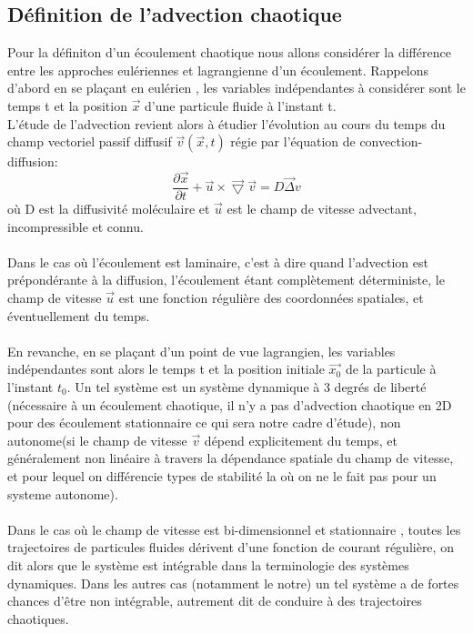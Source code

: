 \documentclass[a4paper,12pt,titlepage]{report}
\begin{document}
\begin{onehalfspace}
\subsection{Définition de l'advection chaotique}
Pour la définiton d'un écoulement chaotique nous allons considérer la différence entre les approches eulériennes et lagrangienne d'un écoulement. 
 Rappelons  d'abord en se plaçant en eulérien , les variables indépendantes à considérer sont le temps t et la position $\vec{x}$ d'une particule fluide à l'instant t. \\
 L'étude de l'advection revient alors à étudier l'évolution au cours du temps du champ vectoriel passif diffusif $\vec{v}(\vec{x},t)$ régie par l'équation de convection-diffusion: 
 \[
 \frac{\partial \vec{x}}{\partial t} + \vec{u} \times \vec{\bigtriangledown}\vec{v}= D \vec{\Delta} v
\]
où D est la diffusivité moléculaire et $\vec{u}$ est le champ de vitesse advectant, incompressible et connu. \\
\\
Dans le cas où l'écoulement est laminaire, c'est à dire quand l'advection est prépondérante à la diffusion, l'écoulement étant complètement déterministe, le champ de vitesse $\vec{u}$ est une fonction régulière des coordonnées spatiales, et éventuellement du temps. 
\\ 
\\
En revanche, en se plaçant d'un point de vue lagrangien, les variables indépendantes sont alors le temps t et la position initiale $\vec{x_0}$ de la particule à l'instant $t_0$. Un tel système est un système dynamique à 3 degrés de liberté (nécessaire à un écoulement chaotique, il n'y a pas d'advection chaotique en 2D pour des écoulement stationnaire ce qui sera notre cadre d'étude), non autonome(si le champ de vitesse $\vec{v}$ dépend explicitement du temps, et généralement non linéaire à travers la dépendance spatiale du champ de vitesse, et pour lequel on différencie types de stabilité la où on ne le fait pas pour un systeme autonome). \\
\\
Dans le cas où le champ de vitesse est bi-dimensionnel et stationnaire , toutes les trajectoires de particules  fluides dérivent d'une fonction de courant régulière, on dit alors que le système est intégrable dans la terminologie des systèmes dynamiques. 
Dans les autres cas (notamment le notre) un tel système a de fortes chances d'être non intégrable, autrement dit de conduire à des trajectoires chaotiques. 
\\
\\

\end{onehalfspace}
\end{document}
